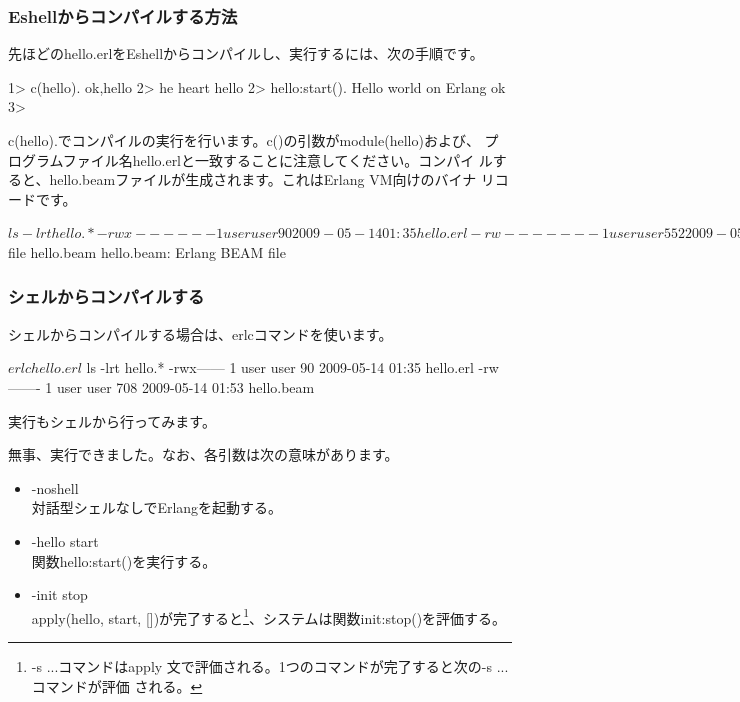 \documentclass[mingoth,a4paper]{jsarticle}
\begin{document}
\subsubsection{Eshellからコンパイルする方法}
先ほどのhello.erlをEshellからコンパイルし、実行するには、次の手順です。

\begin{commandline}
1> c(hello).
{ok,hello}
2> he
heart    hello    
2> hello:start().
Hello world on Erlang
ok
3> 
\end{commandline}

c(hello).でコンパイルの実行を行います。c()の引数がmodule(hello)および、
プログラムファイル名hello.erlと一致することに注意してください。コンパイ
ルすると、hello.beamファイルが生成されます。これはErlang VM向けのバイナ
リコードです。

\begin{commandline}
$ ls -lrt hello.*
-rwx------ 1 user user   90 2009-05-14 01:35 hello.erl
-rw------- 1 user user  552 2009-05-14 01:35 hello.beam
$ file hello.beam 
hello.beam: Erlang BEAM file
\end{commandline}

\subsubsection{シェルからコンパイルする}
シェルからコンパイルする場合は、erlcコマンドを使います。

\begin{commandline}
$ erlc hello.erl
$ ls -lrt hello.*
-rwx------ 1 user user   90 2009-05-14 01:35 hello.erl
-rw------- 1 user user  708 2009-05-14 01:53 hello.beam
\end{commandline}

実行もシェルから行ってみます。


無事、実行できました。なお、各引数は次の意味があります。

\begin{itemize}
 \item -noshell \\
       対話型シェルなしでErlangを起動する。
 \item -hello start \\
       関数hello:start()を実行する。
 \item -init stop \\
       apply(hello, start, [])が完了すると\footnote{-s ...コマンドはapply
       文で評価される。1つのコマンドが完了すると次の-s ...コマンドが評価
       される。}、システムは関数init:stop()を評価する。
\end{itemize}
\end{document}
